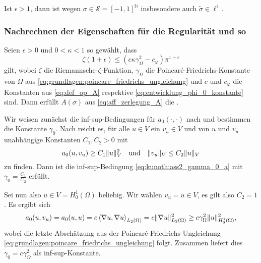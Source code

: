 Ist $\epsilon > 1$, dann ist wegen $\sigma \in \mathcal S = [-1, 1]^{\mathbb{N}}$ insbesondere auch $\tilde \sigma \in \ell^{1}$.


\subsubsection{Nachrechnen der Eigenschaften für die Regularität und so} %
\label{ssub:nachrechnen_von_thref_thm_kunoth_assumption2}

\begin{Satz}
    \label{satz:regularitaet_nachrechnen}
    Seien $\epsilon > 0$ und $0 < \kappa < 1$ so gewählt, dass
    \begin{equation}
        \zeta(1 + \epsilon) \leq (c \kappa \gamma_{\Omega}^{2} - c_{\varphi}) \pi^{1+\epsilon}
    \end{equation}
    gilt,
    wobei $\zeta$ die Riemannsche-$\zeta$-Funktion, $\gamma_{\Omega}$ die Poincaré-Friedrichs-Konstante von $\Omega$ aus \eqref{eq:grundlagen:poincare_friedrichs_ungleichung} und $c$ und $c_{\varphi}$ die Konstanten aus \eqref{eq:def_op_A} respektive \eqref{eq:entwicklung_phi_0_konstante} sind.
    Dann erfüllt $A(\sigma)$ aus \eqref{eq:aff_zerlegung_A} die .

    \begin{Beweis}
        Wir weisen zunächst die inf-sup-Bedingungen für $a_{0}(\cdot, \cdot)$ nach und bestimmen die Konstante $\gamma_{0}$.
        Nach  reicht es, für alle $u \in V$ ein $v_{u} \in V$ und von $u$ und $v_{u}$ unabhängige Konstanten $C_{1}, C_{2} > 0$ mit
        \begin{equation}
            a_{0}(u, v_{u}) \geq C_{1} \lVert u\rVert_{V}^{2} \quad \text{und} \quad \lVert v_{u}\rVert_{V} \leq C_{2} \lVert u\rVert_{V}
        \end{equation}
        zu finden.
        Dann ist die inf-sup-Bedingung \eqref{eq:kunoth:ass2_gamma_0_a} mit $\gamma_{0} = \frac{C_{1}}{C_{2}}$ erfüllt.

        Sei nun also $u \in V = H^{1}_{0}(\Omega)$ beliebig.
        Wir wählen $v_{u} = u \in V$, es gilt also $C_{2} = 1$.
        Es ergibt sich
        \begin{align}
            a_{0}(u, v_{u}) = a_{0}(u, u) = c \left\langle\nabla u,\nabla u\right\rangle_{L_{2}(\Omega)} = c \lVert\nabla u\rVert_{L_{2}(\Omega)}^{2} \geq c \gamma_{\Omega}^{2} \lVert u\rVert_{H^{1}_{0}(\Omega)}^{2},
        \end{align}
        wobei die letzte Abschätzung aus der Poincaré-Friedrichs-Ungleichung \eqref{eq:grundlagen:poincare_friedrichs_ungleichung} folgt.
        Zusammen liefert dies $\gamma_{0} = c \gamma_{\Omega}^{2}$ als inf-sup-Konstante.


\end{Beweis}
\end{Satz}
